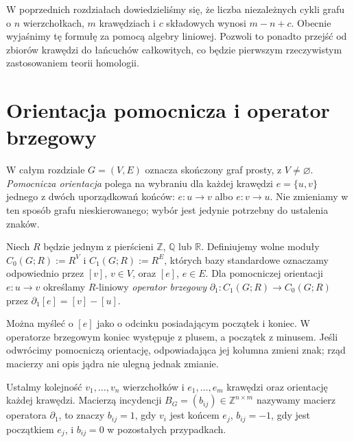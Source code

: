 W poprzednich rozdziałach dowiedzieliśmy się, że liczba niezależnych
cykli grafu o $n$ wierzchołkach, $m$ krawędziach i $c$ składowych wynosi
$m-n+c$. Obecnie wyjaśnimy tę formułę za pomocą algebry liniowej.
Pozwoli to ponadto przejść od zbiorów krawędzi do łańcuchów całkowitych,
co będzie pierwszym rzeczywistym zastosowaniem teorii homologii.

\section{Orientacja pomocnicza i operator brzegowy}
\label{sec:tg-boundary}

W całym rozdziale $G=(V,E)$ oznacza skończony graf prosty, z $V\ne\varnothing$.
\emph{Pomocnicza orientacja} polega na wybraniu dla każdej krawędzi
$e=\{u,v\}$ jednego z dwóch uporządkowań końców: $e:u\to v$ albo
$e:v\to u$. Nie zmieniamy w ten sposób grafu nieskierowanego;
wybór jest jedynie potrzebny do ustalenia znaków.

\begin{definicja}
Niech $R$ będzie jednym z pierścieni $\mathbb Z$, $\mathbb Q$ lub
$\mathbb R$. Definiujemy wolne moduły
$C_0(G;R):=R^V$ i $C_1(G;R):=R^E$, których bazy standardowe
oznaczamy odpowiednio przez $[v]$, $v\in V$, oraz $[e]$, $e\in E$.
Dla pomocniczej orientacji $e:u\to v$ określamy $R$-liniowy
\emph{operator brzegowy} $\partial_1:C_1(G;R)\to C_0(G;R)$ przez
$\partial_1[e]=[v]-[u]$.
\end{definicja}

Można myśleć o $[e]$ jako o odcinku posiadającym początek i koniec.
W operatorze brzegowym koniec występuje z plusem, a początek z minusem.
Jeśli odwrócimy pomocniczą orientację, odpowiadająca jej kolumna
zmieni znak; rząd macierzy ani opis jądra nie ulegną jednak zmianie.

\begin{definicja}
Ustalmy kolejność $v_1,\ldots,v_n$ wierzchołków i $e_1,\ldots,e_m$
krawędzi oraz orientację każdej krawędzi. Macierzą incydencji
$B_G=(b_{ij})\in\mathbb Z^{n\times m}$ nazywamy macierz operatora
$\partial_1$, to znaczy $b_{ij}=1$, gdy $v_i$ jest końcem $e_j$,
$b_{ij}=-1$, gdy jest początkiem $e_j$, i $b_{ij}=0$ w pozostałych
przypadkach.
\end{definicja}

\begin{center}
\end{center}

